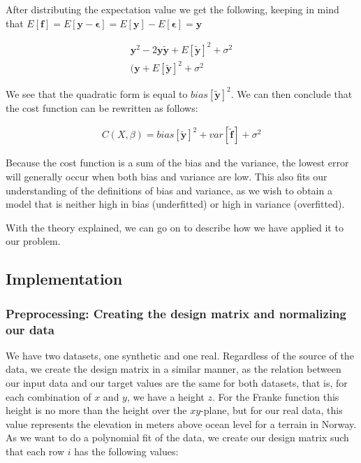 \documentclass[twocolumn,10pt,cleanfoot]{asme2ej}
\begin{document}
After distributing the expectation value we get the following, keeping in mind that $E[\bm{f}] = E[\bm{y} - \bm{\epsilon}] = E[\bm{y}] - E[\bm{\epsilon}] = \bm{y}$

\begin{gather}
\bm{y}^2 - 2\bm{y}\bm{\tilde{y}} + E[\bm{\tilde{y}}]^2 + \sigma^2 \\
(\bm{y} + E[\bm{\tilde{y}}]^2 + \sigma^2 
\end{gather}

We see that the quadratic form is equal to $bias[\bm{\tilde{y}}]^2$. We can then conclude that the cost function can be rewritten as follows:

\begin{gather}
C(X,\beta) = bias[\bm{\tilde{y}}]^2 + var[\bm{\tilde{f}}] + \sigma^2 
\end{gather}


Because the cost function is a sum of the bias and the variance, the lowest error will generally occur when both bias and variance are low. This also fits our understanding of the definitions of bias and variance, as we wish to obtain a model that is neither high in bias (underfitted) or high in variance (overfitted).


With the theory explained, we can go on to describe how we have applied it to our problem.




\subsection{Implementation}
\subsubsection{Preprocessing: Creating the design matrix and normalizing our data}
We have two datasets, one synthetic and one real. Regardless of the source of the data, we create the design matrix in a similar manner, as the relation between our input data and our target values are the same for both datasets, that is, for each combination of $x$ and $y$, we have a height $z$. For the Franke function this height is no more than the height over the $xy$-plane, but for our real data, this value represents the elevation in meters above ocean level for a terrain in Norway. As we want to do a polynomial fit of the data, we create our design matrix such that each row $i$ has the following values:
\end{document}
